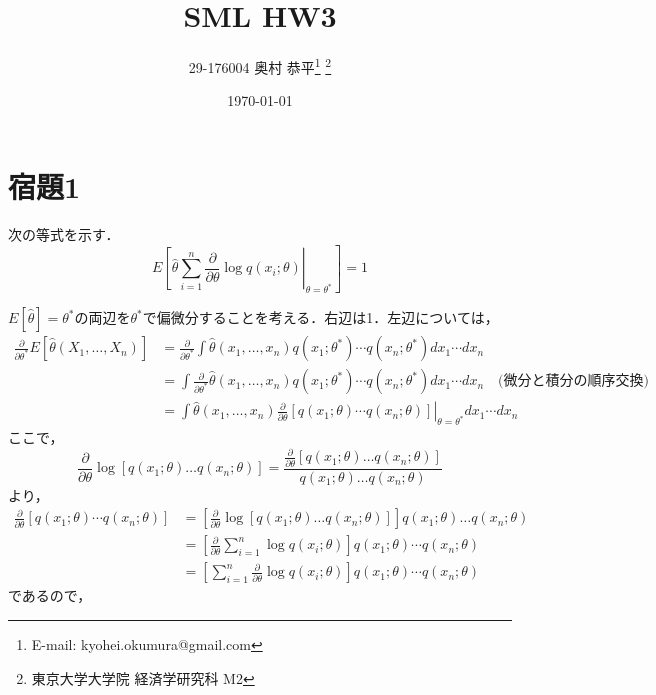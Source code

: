\documentclass[11pt,a4paper,dvipdfmx]{article}
\theoremstyle{plain}
\renewcommand{\hat}{\widehat}
\newcommand{\1}{\mbox{1}\hspace{-0.25em}\mbox{l}}
\begin{document}
\title{SML HW3}
\author{29-176004 奥村 恭平{\footnote{E-mail: kyohei.okumura@gmail.com}
\footnote{東京大学大学院 経済学研究科 M2}
}}
\date{\today}
\maketitle


\section*{宿題1}
次の等式を示す．
\begin{equation} \label{goal1}
	E \left. \left[ \hat{\theta} \sum_{i=1}^n \frac{\partial}{\partial \theta} \log q(x_i; \theta) \right|_{\theta = \theta^*} \right] = 1
\end{equation}

$E[\hat{\theta}] = \theta^*$の両辺を$\theta^*$で偏微分することを考える．右辺は1．左辺については，
\begin{align*}
	\frac{\partial}{\partial \theta^*} E[\hat{\theta}(X_1, \dots, X_n)]
	&= \frac{\partial}{\partial \theta^*} \int \hat{\theta}(x_1, \dots, x_n) q(x_1; \theta^*) \cdots q(x_n; \theta^*) dx_1 \cdots dx_n \\
	&= \int \frac{\partial}{\partial \theta^*} \hat{\theta}(x_1, \dots, x_n) q(x_1; \theta^*) \cdots q(x_n; \theta^*) dx_1 \cdots dx_n \quad \text{(微分と積分の順序交換)}\\
	&= \int \hat{\theta}(x_1, \dots, x_n)
	\left.
	\frac{\partial}{\partial \theta}
	\left[
	q(x_1; \theta) \cdots q(x_n; \theta)
	\right]
	\right|_{\theta = \theta^*}
	dx_1 \cdots dx_n
\end{align*}
ここで，
$$
\frac{\partial}{\partial \theta} \log [q(x_1;\theta) \dots q(x_n; \theta)]
=
\frac{\frac{\partial}{\partial \theta} [q(x_1;\theta) \dots q(x_n; \theta)]}{q(x_1;\theta) \dots q(x_n; \theta)}
$$
より，
\begin{align*}
\frac{\partial}{\partial \theta}
\left[
q(x_1; \theta) \cdots q(x_n; \theta)
\right]
&=
\left[
\frac{\partial}{\partial \theta} \log [q(x_1;\theta) \dots q(x_n; \theta)]
\right]
q(x_1;\theta) \dots q(x_n; \theta) \\
&=
\left[
\frac{\partial}{\partial \theta} \sum_{i=1}^n \log q(x_i; \theta)
\right]
q(x_1; \theta) \cdots q(x_n; \theta) \\
&=
\left[
\sum_{i=1}^n \frac{\partial}{\partial \theta} \log q(x_i; \theta)
\right]
q(x_1; \theta) \cdots q(x_n; \theta)
\end{align*}
であるので，
\end{document}
